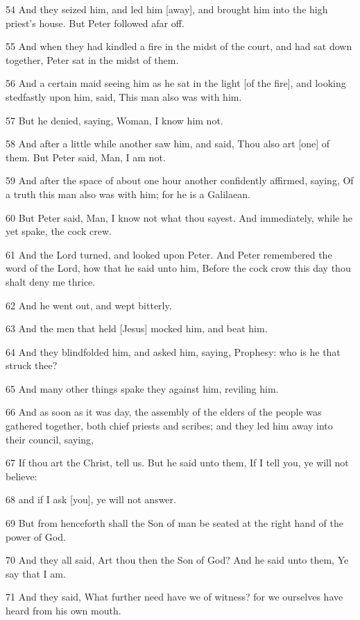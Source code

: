 \par 54 And they seized him, and led him [away], and brought him into the high priest's house. But Peter followed afar off.
\par 55 And when they had kindled a fire in the midst of the court, and had sat down together, Peter sat in the midst of them.
\par 56 And a certain maid seeing him as he sat in the light [of the fire], and looking stedfastly upon him, said, This man also was with him.
\par 57 But he denied, saying, Woman, I know him not.
\par 58 And after a little while another saw him, and said, Thou also art [one] of them. But Peter said, Man, I am not.
\par 59 And after the space of about one hour another confidently affirmed, saying, Of a truth this man also was with him; for he is a Galilaean.
\par 60 But Peter said, Man, I know not what thou sayest. And immediately, while he yet spake, the cock crew.
\par 61 And the Lord turned, and looked upon Peter. And Peter remembered the word of the Lord, how that he said unto him, Before the cock crow this day thou shalt deny me thrice.
\par 62 And he went out, and wept bitterly.
\par 63 And the men that held [Jesus] mocked him, and beat him.
\par 64 And they blindfolded him, and asked him, saying, Prophesy: who is he that struck thee?
\par 65 And many other things spake they against him, reviling him.
\par 66 And as soon as it was day, the assembly of the elders of the people was gathered together, both chief priests and scribes; and they led him away into their council, saying,
\par 67 If thou art the Christ, tell us. But he said unto them, If I tell you, ye will not believe:
\par 68 and if I ask [you], ye will not answer.
\par 69 But from henceforth shall the Son of man be seated at the right hand of the power of God.
\par 70 And they all said, Art thou then the Son of God? And he said unto them, Ye say that I am.
\par 71 And they said, What further need have we of witness? for we ourselves have heard from his own mouth.

